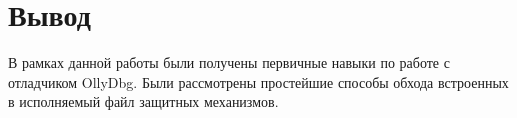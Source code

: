 \chapter{Вывод}

В рамках данной работы были получены первичные навыки по работе с отладчиком OllyDbg. Были рассмотрены простейшие способы обхода встроенных в исполняемый файл защитных механизмов.